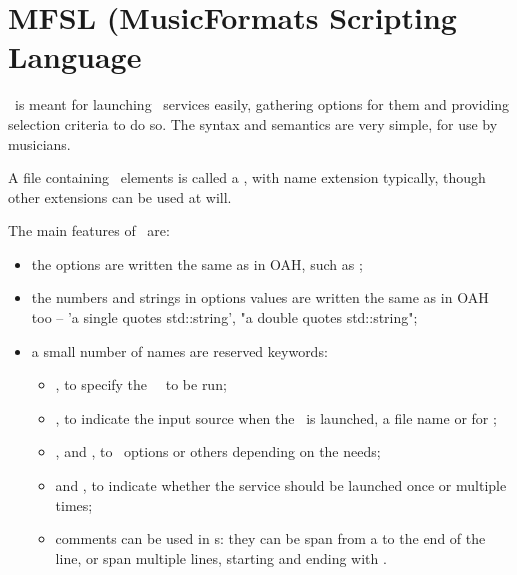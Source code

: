 



\chapter{MFSL (MusicFormats Scripting Language}

\mfslLang\ is meant for launching \mf\ services easily, gathering options for them and providing selection criteria to do so. The syntax and semantics are very simple, for use by musicians.

A file containing \mfslLang\ elements is called a {\it \script}, with name extension  typically, though other extensions can be used at will.

The main features of \mfslLang\ are:
\begin{itemize}
\item the options are written the same as in OAH, such as ;

\item the numbers and strings in options values are written the same as in OAH too -- 'a single quotes std::string', "a double quotes std::string";

\item a small number of names are reserved keywords:
\begin{itemize}
\item {}, to specify the \mf\ \service\ to be run;
\item {}, to indicate the input source when the \service\ is launched, a file name or \code{-} for \standardInput;
\item {},  and , to \select\ options or others depending on the needs;
\item {} and , to indicate whether the service should be launched once or multiple times;
\item comments can be used in \script s: they can be span from a \code{\#} to the end of the line, or span multiple lines, starting and ending with \code{\#\#\#}.
\end{itemize}
\end{itemize}

